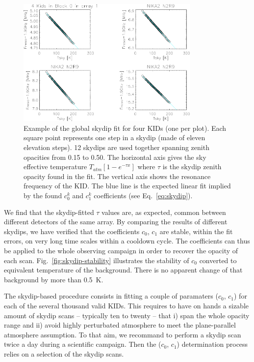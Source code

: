\begin{figure}[ht!]
\begin{center}
\includegraphics[clip=true,width=0.8\textwidth]{Figures/Opacity/test_allskd4_N2R9v5_5-crop.pdf}
\caption[]{Example of the global skydip fit for four KIDs (one per plot).
Each square point represents one step in a skydip (made of eleven
elevation steps). 12 skydips are used together spanning zenith
opacities from 0.15 to 0.50. The horizontal axis gives the sky
effective temperature $T_{atm}[1-e^{-\tau x}]$ where $\tau$ is the
skydip zenith opacity found in the fit. The vertical axis shows the
resonance frequency of the KID. The blue line is the expected linear
fit implied by the found $c_0^k$ and $c_1^k$ coefficients (see
Eq.~\ref{eq:skydip}). }
\label{fig:skydipfitexample}
\end{center}
\end{figure}

We find that the skydip-fitted $\tau$ values are, as expected,
common between different detectors of the same array. By comparing the
results of different skydips, we have verified that the
coefficients $c_0$, $c_1$ are stable, within the fit errors, on very
long time scales within a cooldown cycle. The coefficients can thus be
applied to the whole observing campaign in order to recover the
opacity of each scan. Fig.~\ref{fig:skydip-stability} illustrates the
stability of $c_0$ converted to equivalent temperature of the
background. There is no apparent change of that background by more
than 0.5~K.


The skydip-based procedure consists in fitting a couple of paramaters
($c_0$, $c_1$) for each of the several thousand valid KIDs. This
requires to have on hands a sizable amount of skydip scans --
typically ten to twenty -- that i) span the whole opacity range and
ii) avoid highly perturbated atmosphere to meet the plane-parallel
atmosphere assumption. To that aim, we recommand to perform a skydip
scan twice a day during a scientific campaign. Then the ($c_0$, $c_1$)
determination process relies on a selection of the skydip scans.





